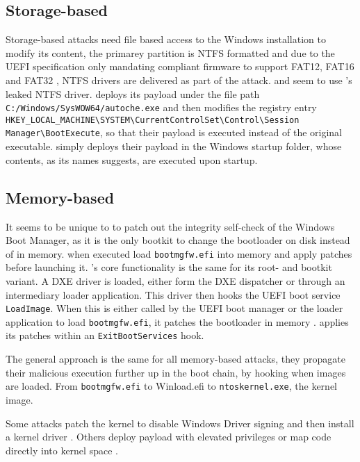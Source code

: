 \subsection{Storage-based}

Storage-based attacks need file based access to the Windows installation to modify its content, the primarey partition is \ac{NTFS} formatted and due to the \ac{UEFI} specification only mandating compliant firmware to support \ac{FAT}12, \ac{FAT}16 and \ac{FAT}32 \cite[13.3.1.1]{uefi-spec}, \ac{NTFS} drivers are delivered as part of the attack. \cite{mosaicregressor} and \cite{lojax} seem to use \cite{vector-edk}'s leaked \ac{NTFS} driver. \cite{lojax} deploys its payload under the file path \lstinline{C:/Windows/SysWOW64/autoche.exe} and then modifies the registry entry \lstinline{HKEY_LOCAL_MACHINE\SYSTEM\CurrentControlSet\Control\Session Manager\BootExecute}, so that their payload is executed instead of the original executable. \cite{mosaicregressor} simply deploys their payload in the Windows startup folder, whose contents, as its names suggests, are executed upon startup.

\subsection{Memory-based}

It seems to be unique to \cite{especter} to patch out the integrity self-check of the Windows Boot Manager, as it is the only bootkit to change the bootloader on disk instead of in memory.
\cite{finspy, dreamboot} when executed load \lstinline{bootmgfw.efi} into memory and apply patches before launching it.
\cite{efiguard}'s core functionality is the same for its root- and bootkit variant.
A \ac{DXE} driver is loaded, either form the \ac{DXE} dispatcher or through an intermediary loader application.
This driver then hooks the \ac{UEFI} boot service \lstinline{LoadImage}. When this is either called by the \ac{UEFI} boot manager or the loader application to load \lstinline{bootmgfw.efi}, it patches the bootloader in memory \cite{efiguard}. \cite{moonbounce} applies its patches within an \lstinline{ExitBootServices} hook.

The general approach is the same for all memory-based attacks, they propagate their malicious execution further up in the boot chain, by hooking when images are loaded. From \lstinline{bootmgfw.efi} to \ac{Winload.efi} to \lstinline{ntoskernel.exe}, the kernel image.

Some attacks patch the kernel to disable Windows Driver signing and then install a kernel driver \cite{efiguard, especter}.
Others deploy payload with elevated privileges \cite{finspy, dreamboot} or map code directly into kernel space \cite{moonbounce, cosmicstrand}.


